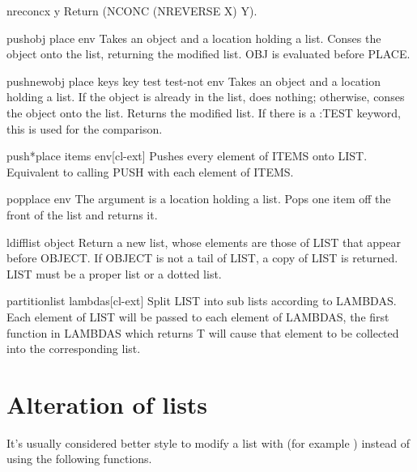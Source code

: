 \documentclass[10pt,english]{book}
\begin{document}
\begin{function}{nreconc}{x y}
  Return (NCONC (NREVERSE X) Y).
\end{function}

\begin{macro}{push}{obj place \env env}
  Takes an object and a location holding a list. Conses the object onto
  the list, returning the modified list. OBJ is evaluated before PLACE.
\end{macro}

\begin{macro}{pushnew}{obj place \rest keys \key key test test-not \env env}
  Takes an object and a location holding a list. If the object is
  already in the list, does nothing; otherwise, conses the object onto
  the list. Returns the modified list. If there is a :TEST keyword, this
  is used for the comparison.
\end{macro}

\begin{macro}{push*}{place \rest items \env env}[cl-ext]
  Pushes every element of ITEMS onto LIST. Equivalent to calling PUSH
  with each element of ITEMS.
\end{macro}

\begin{macro}{pop}{place \env env}
  The argument is a location holding a list. Pops one item off the front
  of the list and returns it.
\end{macro}

\begin{function}{ldiff}{list object}
  Return a new list, whose elements are those of LIST that appear before
   OBJECT. If OBJECT is not a tail of LIST, a copy of LIST is returned.
   LIST must be a proper list or a dotted list.
\end{function}

\begin{function}{partition}{list \rest lambdas}[cl-ext]
  Split LIST into sub lists according to LAMBDAS. Each element of LIST
  will be passed to each element of LAMBDAS, the first function in
  LAMBDAS which returns T will cause that element to be collected into
  the corresponding list.
\end{function}

\section{Alteration of lists}
\label{sec:alteration-lists}

It's usually considered better style to modify a list with
 (for example ) instead of
using the following functions.
\end{document}
